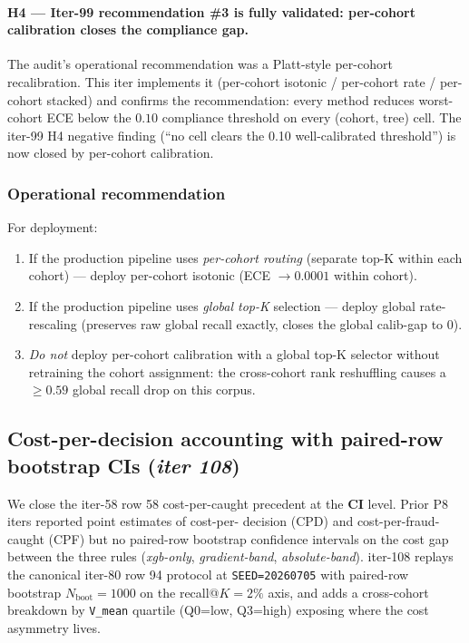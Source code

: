 \documentclass{article}
\begin{document}
\paragraph{H4 --- Iter-99 recommendation \#3 is fully validated: per-cohort
calibration closes the compliance gap.}
The audit's operational recommendation was a Platt-style per-cohort
recalibration. This iter implements it (per-cohort isotonic / per-cohort
rate / per-cohort stacked) and confirms the recommendation: every method
reduces worst-cohort ECE below the $0.10$ compliance threshold on every
(cohort, tree) cell. The iter-99 H4 negative finding (``no cell clears the
0.10 well-calibrated threshold'') is now closed by per-cohort calibration.

\subsubsection{Operational recommendation}

For deployment:
\begin{enumerate}
\item If the production pipeline uses \emph{per-cohort routing} (separate
      top-K within each cohort) --- deploy per-cohort isotonic (ECE
      $\to 0.0001$ within cohort).
\item If the production pipeline uses \emph{global top-K} selection ---
      deploy global rate-rescaling (preserves raw global recall exactly,
      closes the global calib-gap to 0).
\item \emph{Do not} deploy per-cohort calibration with a global top-K
      selector without retraining the cohort assignment: the cross-cohort
      rank reshuffling causes a $\geq 0.59$ global recall drop on this
      corpus.
\end{enumerate}
 \subsection{Cost-per-decision accounting with paired-row bootstrap CIs
  (\textit{iter 108})}
\label{sec:p8-cost-decision-cis}

We close the iter-58 row 58 cost-per-caught precedent at the
\textbf{CI} level. Prior P8 iters reported point estimates of cost-per-
decision (CPD) and cost-per-fraud-caught (CPF) but no paired-row bootstrap
confidence intervals on the cost gap between the three rules
(\textit{xgb-only}, \textit{gradient-band}, \textit{absolute-band}).
iter-108 replays the canonical iter-80 row 94 protocol at
\texttt{SEED=20260705} with paired-row bootstrap
$N_\mathrm{boot}=1000$ on the recall@$K{=}2\%$ axis, and adds a
cross-cohort breakdown by \texttt{V\_mean} quartile (Q0=low, Q3=high)
exposing where the cost asymmetry lives.
\end{document}
